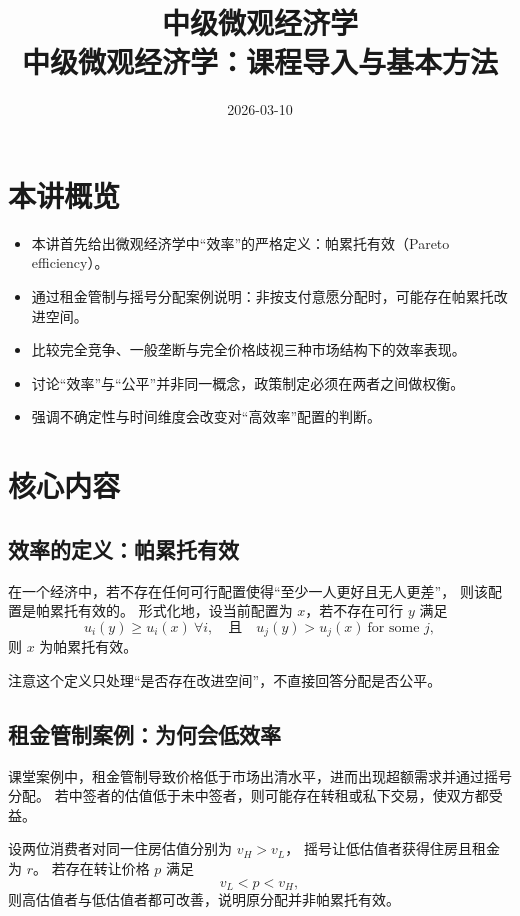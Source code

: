 \documentclass[UTF8,11pt,a4paper]{ctexart}
\title{ 中级微观经济学 \\ \large 中级微观经济学：课程导入与基本方法 }
\author{}
\date{2026-03-10}
\begin{document}
\maketitle

\section{本讲概览}

\begin{itemize}
  \item 本讲首先给出微观经济学中“效率”的严格定义：帕累托有效（Pareto efficiency）。
  \item 通过租金管制与摇号分配案例说明：非按支付意愿分配时，可能存在帕累托改进空间。
  \item 比较完全竞争、一般垄断与完全价格歧视三种市场结构下的效率表现。
  \item 讨论“效率”与“公平”并非同一概念，政策制定必须在两者之间做权衡。
  \item 强调不确定性与时间维度会改变对“高效率”配置的判断。
\end{itemize}

\section{核心内容}

\subsection{效率的定义：帕累托有效}

在一个经济中，若不存在任何可行配置使得“至少一人更好且无人更差”，
则该配置是帕累托有效的。
形式化地，设当前配置为 $x$，若不存在可行 $y$ 满足
\begin{equation}
  u_i(y) \ge u_i(x) \ \forall i, \quad \text{且}\quad u_j(y) > u_j(x) \ \text{for some } j,
\end{equation}
则 $x$ 为帕累托有效。

注意这个定义只处理“是否存在改进空间”，不直接回答分配是否公平。

\subsection{租金管制案例：为何会低效率}

课堂案例中，租金管制导致价格低于市场出清水平，进而出现超额需求并通过摇号分配。
若中签者的估值低于未中签者，则可能存在转租或私下交易，使双方都受益。

设两位消费者对同一住房估值分别为 $v_H>v_L$，
摇号让低估值者获得住房且租金为 $r$。
若存在转让价格 $p$ 满足
\begin{equation}
  v_L < p < v_H,
\end{equation}
则高估值者与低估值者都可改善，说明原分配并非帕累托有效。
\end{document}
